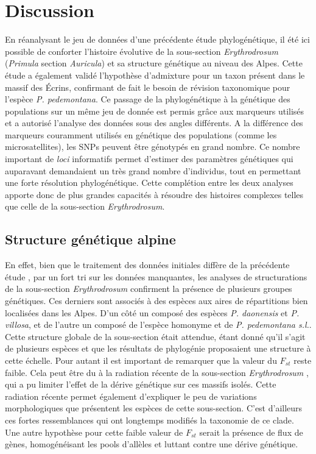 \section{Discussion}

En réanalysant le jeu de données d'une précédente étude phylogénétique, il été ici possible de conforter l'histoire évolutive de la sous-section \textit{Erythrodrosum} (\textit{Primula} section \textit{Auricula}) et sa structure génétique au niveau des Alpes. Cette étude a également validé l'hypothèse d'admixture pour un taxon présent dans le massif des Écrins, confirmant de fait  le besoin de révision taxonomique pour l'espèce \textit{P. pedemontana}. Ce passage de la phylogénétique à la génétique des populations sur un même jeu de donnée est permis grâce aux marqueurs utilisés et a autorisé l'analyse des données sous des angles différents. A la différence des marqueurs couramment utilisés en génétique des populations (comme les microsatellites), les SNPs peuvent être génotypés en grand nombre. Ce nombre important de \textit{loci} informatifs permet d'estimer des paramètres génétiques qui auparavant demandaient un très grand nombre d'individus, tout en permettant une forte résolution phylogénétique. Cette complétion entre les deux analyses apporte donc de plus grandes capacités à résoudre des histoires complexes telles que celle de la sous-section \textit{Erythrodrosum}.

\subsection{Structure génétique alpine}

En effet, bien que le traitement des données initiales diffère de la précédente étude \citep{Boucher2016a}, par un fort tri sur les données manquantes, les analyses de structurations de la sous-section \textit{Erythrodrosum} confirment la présence de plusieurs groupes génétiques. Ces derniers sont associés à des espèces aux aires de répartitions bien localisées dans les Alpes. D'un côté un  composé des espèces \textit{P. daonensis} et \textit{P. villosa}, et de l'autre un  composé de l'espèce homonyme et de \textit{P. pedemontana s.l.}. Cette structure globale de la sous-section était attendue, étant donné qu'il s'agit de plusieurs espèces et que les résultats de phylogénie proposaient une structure à cette échelle. Pour autant il est important de remarquer que la valeur du $F_{st}$ reste faible. Cela peut être du à la radiation récente de la sous-section \textit{Erythrodrosum} \citep{Boucher2016}, qui a pu limiter l'effet de la dérive génétique sur ces massifs isolés. Cette radiation récente permet également d'expliquer le peu de variations morphologiques que présentent les espèces de cette sous-section. C'est d'ailleurs ces fortes ressemblances qui ont longtemps modifiés la taxonomie de ce clade. Une autre hypothèse pour cette faible valeur de $F_{st}$ serait la présence de flux de gènes, homogénéisant les pools d'allèles et luttant contre une dérive génétique.
 
